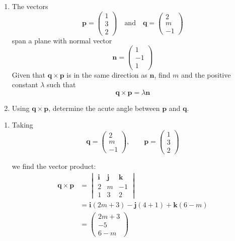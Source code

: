 \documentclass[leqno]{article}
\begin{document}
\djsFrontMatter
\begin{enumerate}[
  label=\textbf{\arabic*.},
  leftmargin=*,
  topsep=0pt,
  partopsep=0pt,
  parsep=0pt
]

\questionitem

\begin{enumerate}[label=\textbf{(\alph*)}]
  \item The vectors
  \[
  \mathbf{p}=\begin{pmatrix}1\\3\\2\end{pmatrix}
  \quad\text{and}\quad
  \mathbf{q}=\begin{pmatrix}2\\m\\-1\end{pmatrix}
  \]
  span a plane with normal vector
  \[
  \mathbf{n}=\begin{pmatrix}1\\-1\\1\end{pmatrix}
  \]
  Given that $\mathbf{q}\times\mathbf{p}$ is in the same direction as $\mathbf{n}$, find $m$ and the positive constant $\lambda$ such that
  \[
  \mathbf{q}\times\mathbf{p}=\lambda\mathbf{n}
  \]
  \item Using $\mathbf{q}\times\mathbf{p}$, determine the acute angle between $\mathbf{p}$ and $\mathbf{q}$.  \\
\end{enumerate}

\vspace*{10pt}

\begin{djsSolution}
\begin{enumerate}[label=\textbf{(\alph*)}]
  \item Taking
\[
\mathbf q=\begin{pmatrix}2\\m\\-1\end{pmatrix},
\qquad
\mathbf p=\begin{pmatrix}1\\3\\2\end{pmatrix}
\]

we find the vector product:
\begin{align*}
\mathbf q\times \mathbf p
&=
\begin{vmatrix}
\mathbf i & \mathbf j & \mathbf k\\
2 & m & -1\\
1 & 3 & 2
\end{vmatrix} \\
&=
\mathbf i(2m+3)-\mathbf j(4+1)+\mathbf k(6-m) \\
&=
\begin{pmatrix}
2m+3\\
-5\\
6-m
\end{pmatrix}
\end{align*}


\end{enumerate}
\end{djsSolution}
\end{enumerate}
\end{document}
